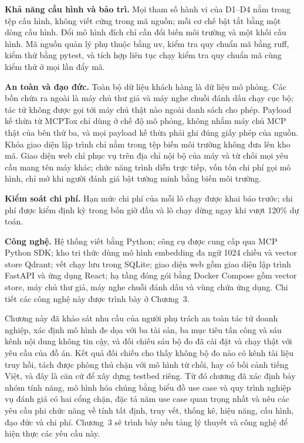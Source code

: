 \documentclass[../DoAn.tex]{subfiles}
\begin{document}
\textbf{Khả năng cấu hình và bảo trì.} Mọi tham số hành vi của D1--D4 nằm trong tệp cấu hình, không viết cứng trong mã nguồn; mỗi cơ chế bật tắt bằng một dòng cấu hình. Đổi mô hình đích chỉ cần đổi biến môi trường và một khối cấu hình. Mã nguồn quản lý phụ thuộc bằng uv, kiểm tra quy chuẩn mã bằng ruff, kiểm thử bằng pytest, và tích hợp liên tục chạy kiểm tra quy chuẩn mã cùng kiểm thử ở mọi lần đẩy mã.

\textbf{An toàn và đạo đức.} Toàn bộ dữ liệu khách hàng là dữ liệu mô phỏng. Các bồn chứa ra ngoài là máy chủ thư giả và máy nghe chuỗi đánh dấu chạy cục bộ; tác tử không được gọi tới máy chủ thật nào ngoài danh sách cho phép. Payload kế thừa từ MCPTox chỉ dùng ở chế độ mô phỏng, không nhắm máy chủ MCP thật của bên thứ ba, và mọi payload kế thừa phải ghi đúng giấy phép của nguồn. Khóa giao diện lập trình chỉ nằm trong tệp biến môi trường không đưa lên kho mã. Giao diện web chỉ phục vụ trên địa chỉ nội bộ của máy và từ chối mọi yêu cầu mang tên máy khác; chức năng trình diễn trực tiếp, vốn tốn chi phí gọi mô hình, chỉ mở khi người đánh giá bật tường minh bằng biến môi trường.

\textbf{Kiểm soát chi phí.} Hạn mức chi phí của mỗi lô chạy được khai báo trước; chi phí được kiểm định kỳ trong bốn giờ đầu và lô chạy dừng ngay khi vượt 120\% dự toán.

\textbf{Công nghệ.} Hệ thống viết bằng Python; công cụ được cung cấp qua MCP Python SDK; kho tri thức dùng mô hình embedding đa ngữ 1024 chiều và vector store Qdrant; vết chạy lưu trong SQLite; giao diện web gồm giao diện lập trình FastAPI và ứng dụng React; hạ tầng đóng gói bằng Docker Compose gồm vector store, máy chủ thư giả, máy nghe chuỗi đánh dấu và vùng chứa ứng dụng. Chi tiết các công nghệ này được trình bày ở Chương~3.

Chương này đã khảo sát nhu cầu của người phụ trách an toàn tác tử doanh nghiệp, xác định mô hình đe dọa với ba tài sản, ba mục tiêu tấn công và sáu kênh nội dung không tin cậy, và đối chiếu sáu bộ đo đã cài đặt và chạy thật với yêu cầu của đồ án. Kết quả đối chiếu cho thấy không bộ đo nào có kênh tài liệu truy hồi, tách được phòng thủ chặn với mô hình từ chối, hay có bối cảnh tiếng Việt, và đây là căn cứ để xây dựng testbed riêng. Từ đó chương đã xác định bảy nhóm tính năng, mô hình hóa chúng bằng biểu đồ use case và quy trình nghiệp vụ đánh giá có hai cổng chặn, đặc tả năm use case quan trọng nhất và nêu các yêu cầu phi chức năng về tính tất định, truy vết, thống kê, hiệu năng, cấu hình, đạo đức và chi phí. Chương~3 sẽ trình bày nền tảng lý thuyết và công nghệ để hiện thực các yêu cầu này.
\end{document}
